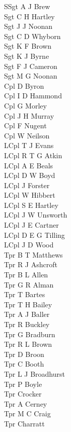 \begin{multicols}{3}
  \small
  \noindent
  SSgt A J Brew \\
  Sgt C H Hartley \\
  Sgt J J Noonan \\
  Sgt C D Whyborn \\
  Sgt K F Brown \\
  Sgt K J Byrne \\
  Sgt F J Cameron \\
  Sgt M G Noonan \\
  Cpl D Byron \\
  Cpl I D Hammond \\
  Cpl G Morley \\
  Cpl J H Murray \\
  Cpl F Nugent \\
  Cpl W Neilson \\
  LCpl T J Evans \\
  LCpl R T G Atkin \\
  LCpl A E Beals \\
  LCpl D W Boyd \\
  LCpl J Forster \\
  LCpl W Hibbert \\
  LCpl S E Hartley \\
  LCpl J W Unsworth \\
  LCpl J E Cartner \\
  LCpl D E G Tilling \\
  LCpl J D Wood \\
  Tpr B T Matthews \\
  Tpr R J Ashcroft \\
  Tpr B L Allen \\
  Tpr G R Alman \\
  Tpr T Bartes \\
  Tpr T H Bailey \\
  Tpr A J Baller \\
  Tpr R Buckley \\
  Tpr G Bradburn \\
  Tpr R L Brown \\
  Tpr D Broon \\
  Tpr C Booth \\
  Tpr L J Broadhurst \\
  Tpr P Boyle \\
  Tpr Crocker \\
  Tpr A Cerney \\
  Tpr M C Craig \\
  Tpr Charratt \\

\end{multicols}
